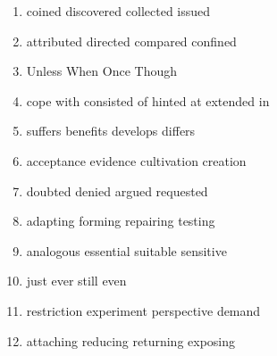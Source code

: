\newpage

\begin{enumerate}
	\item

\fourchoices
{coined}
{discovered}
{collected}
{issued}



\item

\fourchoices
{attributed}
{directed}
{compared}
{confined}

\item

\fourchoices
{Unless}
{When}
{Once}
{Though}


\item

\fourchoices
{cope with}
{consisted of}
{hinted at}
{extended in}


\item

\fourchoices
{suffers}
{benefits}
{develops}
{differs}


\item

\fourchoices
{acceptance}
{evidence}
{cultivation}
{creation}


\item
\fourchoices
{doubted}
{denied}
{argued}
{requested}


\item

\fourchoices
{adapting}
{forming}
{repairing}
{testing}

\item 
\fourchoices
{analogous}
{essential}
{suitable}
{sensitive}


\item

\fourchoices
{just}
{ever}
{still}
{even}



\item

\fourchoices
{restriction}
{experiment}
{perspective}
{demand}


\item

\fourchoices
{attaching}
{reducing}
{returning}
{exposing}




\end{enumerate}
